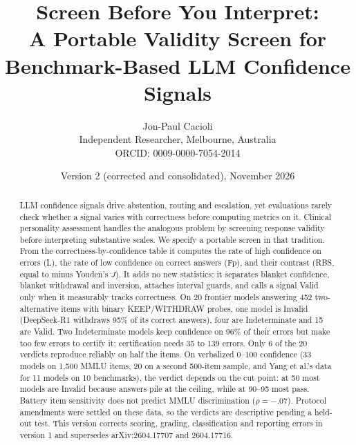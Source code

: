 \documentclass[11pt,a4paper]{article}
\title{Screen Before You Interpret:\\A Portable Validity Screen for Benchmark-Based LLM Confidence Signals}
\author{Jon-Paul Cacioli\\
Independent Researcher, Melbourne, Australia\\
ORCID: 0009-0000-7054-2014}
\date{Version 2 (corrected and consolidated), November 2026}
\begin{document}
\maketitle

\begin{abstract}
\noindent LLM confidence signals drive abstention, routing and escalation, yet evaluations rarely check whether a signal varies with correctness before computing metrics on it. Clinical personality assessment handles the analogous problem by screening response validity before interpreting substantive scales. We specify a portable screen in that tradition. From the correctness-by-confidence table it computes the rate of high confidence on errors (L), the rate of low confidence on correct answers (Fp), and their contrast (RBS, equal to minus Youden's $J$). It adds no new statistics: it separates blanket confidence, blanket withdrawal and inversion, attaches interval guards, and calls a signal Valid only when it measurably tracks correctness. On 20 frontier models answering 452 two-alternative items with binary KEEP/WITHDRAW probes, one model is Invalid (DeepSeek-R1 withdraws 95\% of its correct answers), four are Indeterminate and 15 are Valid. Two Indeterminate models keep confidence on 96\% of their errors but make too few errors to certify it; certification needs 35 to 139 errors. Only 6 of the 20 verdicts reproduce reliably on half the items. On verbalized 0--100 confidence (33 models on 1,500 MMLU items, 20 on a second 500-item sample, and Yang et al.'s data for 11 models on 10 benchmarks), the verdict depends on the cut point: at 50 most models are Invalid because answers pile at the ceiling, while at 90--95 most pass. Battery item sensitivity does not predict MMLU discrimination ($\rho = -.07$). Protocol amendments were settled on these data, so the verdicts are descriptive pending a held-out test. This version corrects scoring, grading, classification and reporting errors in version 1 and supersedes arXiv:2604.17707 and 2604.17716.
\end{abstract}
\end{document}
